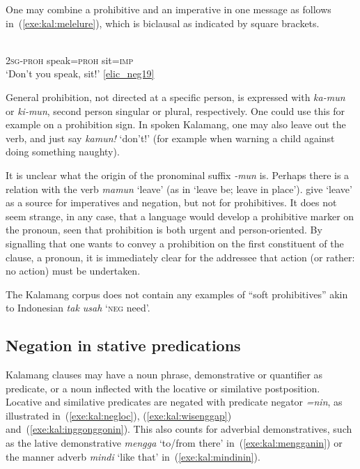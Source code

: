 \documentclass[output=paper,colorlinks,citecolor=brown,draft]{langscibook}
\begin{document}
One may combine a prohibitive and an imperative in one message as follows in~(\ref{exe:kal:melelure}), which is biclausal as indicated by square brackets.

\ea \label{exe:kal:melelure}
\gll [ka-\textbf{mun} ewa=\textbf{in}] [melelu=te]\\
\textsc{2sg-proh} speak=\textsc{proh} sit=\textsc{imp}\\
\glt `Don't you speak, sit!' {\href{http://hdl.handle.net/10050/00-0000-0000-0004-1C60-A}{[elic\_neg19]}}
\z 

General prohibition, not directed at a specific person, is expressed with \textit{ka-mun} or \textit{ki-mun}, second person singular or plural, respectively. One could use this for example on a prohibition sign. In spoken Kalamang, one may also leave out the verb, and just say \textit{kamun!} `don't!' (for example when warning a child against doing something naughty).

It is unclear what the origin of the pronominal suffix \textit{-mun} is. Perhaps there is a relation with the verb \textit{mamun} `leave' (as in `leave be; leave in place'). \citet{KutevaEtAl2019} give `leave' as a source for imperatives and negation, but not for prohibitives. It does not seem strange, in any case, that a language would develop a prohibitive marker on the pronoun, seen that prohibition is both urgent and person-oriented. By signalling that one wants to convey a prohibition on the first constituent of the clause, a pronoun, it is immediately clear for the addressee that action (or rather: no action) must be undertaken.

The Kalamang corpus does not contain any examples of ``soft prohibitives'' akin to Indonesian \textit{tak usah} `\textsc{neg} need'.



\subsection{Negation in stative predications}
\label{sec:negnonv} 
Kalamang clauses may have a noun phrase, demonstrative or quantifier as predicate, or a noun inflected with the locative or similative postposition. Locative and similative predicates are negated with predicate negator \textit{=nin}, as illustrated in~(\ref{exe:kal:negloc}), (\ref{exe:kal:wisenggap}) and~(\ref{exe:kal:inggonggonin}). This also counts for adverbial demonstratives, such as the lative demonstrative \textit{mengga} `to/from there' in~(\ref{exe:kal:mengganin}) or the manner adverb \textit{mindi} `like that' in~(\ref{exe:kal:mindinin}).
\end{document}
